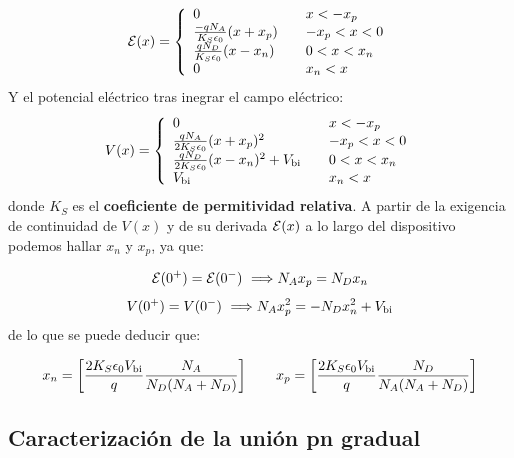 \begin{equation}
    \mathcal{E} (x) = \left\lbrace  \begin{array}{ll}
    0 & \quad x < -x_p \\
    \frac{-q N_A}{K_S\epsilon_0} (x+x_p) & \quad   -x_p< x < 0  \\
    \frac{q N_D}{K_S\epsilon_0} (x-x_n)& \quad 0< x < x_n \\
    0 & \quad x_n < x    \\ 
    \end{array}  \right.
\end{equation}
Y el potencial eléctrico tras inegrar el campo eléctrico: 
\begin{equation}
    V (x) = \left\lbrace  \begin{array}{ll}
    0 & \quad x < -x_p \\
    \frac{q N_A}{2K_S\epsilon_0} (x+x_p)^2 & \quad   -x_p< x < 0  \\
    \frac{q N_D}{2K_S\epsilon_0} (x-x_n)^2 + V_{\text{bi}} & \quad 0< x < x_n \\
    V_{\text{bi}} & \quad x_n < x    \\
    \end{array}  \right.
\end{equation}
donde $K_S$ es  el \textbf{coeficiente de permitividad relativa}. A partir de la exigencia de continuidad de $V(x)$ y de su derivada $\mathcal{E}(x)$ a lo largo del dispositivo podemos hallar $x_n$ y $x_p$, ya que: 

\begin{equation}
    \Ecal(0^+) = \Ecal(0^-) \ \Longrightarrow N_A x_p = N_D x_n
\end{equation}
\begin{equation}
    V(0^+) = V(0^-) \ \Longrightarrow N_A x_p^2 = -N_D x_n^2 + V_{\text{bi}}
\end{equation}
de lo que se puede deducir que: 

\begin{equation}
    x_n = \left[ \frac{2K_S\epsilon_0 V_{\text{bi}}}{q} \frac{N_A}{N_D(N_A+N_D)} \right] \qquad 
    x_p = \left[ \frac{2K_S\epsilon_0 V_{\text{bi}}}{q} \frac{N_D}{N_A(N_A+N_D)} \right]
\end{equation}

\subsection{Caracterización de la unión pn gradual}


